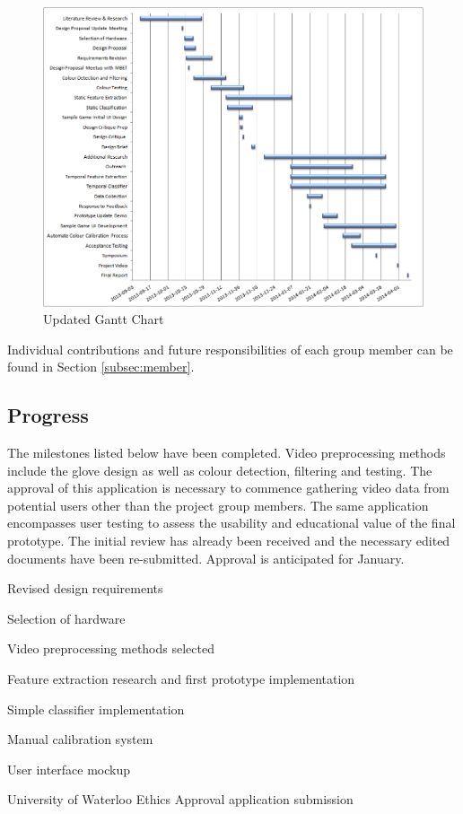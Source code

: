 \documentclass[12pt]{article}
\begin{document}
\begin{figure}[h!]
  \centering
  \includegraphics[scale=1]{Gantt.png}
  \caption{Updated Gantt Chart}
  \label{fig:gantt}
\end{figure}

Individual contributions and future responsibilities of each group member can be found in Section \ref{subsec:member}.

\subsection{Progress}
The milestones listed below have been completed. Video preprocessing methods include the glove design as well as colour detection, filtering and testing. The approval of this application is necessary to commence gathering video data from potential users other than the project group members. The same application encompasses user testing to assess the usability and educational value of the final prototype. The initial review has already been received and the necessary edited documents have been re-submitted. Approval is anticipated for January.
\begin{enumerate*}
  \item Revised design requirements
  \item Selection of hardware
  \item Video preprocessing methods selected
  \item Feature extraction research and first prototype implementation
  \item Simple classifier implementation
  \item Manual calibration system
  \item User interface mockup
  \item University of Waterloo Ethics Approval application submission
\end{enumerate*}
\end{document}
